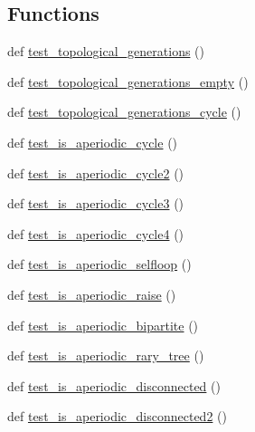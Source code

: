 \subsection*{Functions}
\begin{DoxyCompactItemize}
\item 
def \hyperlink{namespacenetworkx_1_1algorithms_1_1tests_1_1test__dag_a7080d417e9d6ce02a70401e19892cd88}{test\+\_\+topological\+\_\+generations} ()
\item 
def \hyperlink{namespacenetworkx_1_1algorithms_1_1tests_1_1test__dag_a781d94dab85882ace50f79833d412bad}{test\+\_\+topological\+\_\+generations\+\_\+empty} ()
\item 
def \hyperlink{namespacenetworkx_1_1algorithms_1_1tests_1_1test__dag_ad8457c64fd4274f7d4ce3594dbc98c3e}{test\+\_\+topological\+\_\+generations\+\_\+cycle} ()
\item 
def \hyperlink{namespacenetworkx_1_1algorithms_1_1tests_1_1test__dag_a518a2e0f6db21c276b9105a496f12f94}{test\+\_\+is\+\_\+aperiodic\+\_\+cycle} ()
\item 
def \hyperlink{namespacenetworkx_1_1algorithms_1_1tests_1_1test__dag_a3743d8eaea870cc82b142f9b525ec639}{test\+\_\+is\+\_\+aperiodic\+\_\+cycle2} ()
\item 
def \hyperlink{namespacenetworkx_1_1algorithms_1_1tests_1_1test__dag_a2d87f47b709488e7031300c8e3f9e455}{test\+\_\+is\+\_\+aperiodic\+\_\+cycle3} ()
\item 
def \hyperlink{namespacenetworkx_1_1algorithms_1_1tests_1_1test__dag_aa475d6f3cefe2f72beb161d60101915b}{test\+\_\+is\+\_\+aperiodic\+\_\+cycle4} ()
\item 
def \hyperlink{namespacenetworkx_1_1algorithms_1_1tests_1_1test__dag_aacf751a12cd0f84d99e8c2e64b95de45}{test\+\_\+is\+\_\+aperiodic\+\_\+selfloop} ()
\item 
def \hyperlink{namespacenetworkx_1_1algorithms_1_1tests_1_1test__dag_a897c1bbc39a730de6e3d789c996e543c}{test\+\_\+is\+\_\+aperiodic\+\_\+raise} ()
\item 
def \hyperlink{namespacenetworkx_1_1algorithms_1_1tests_1_1test__dag_af5e0bc8ad09288520943384726cda9b3}{test\+\_\+is\+\_\+aperiodic\+\_\+bipartite} ()
\item 
def \hyperlink{namespacenetworkx_1_1algorithms_1_1tests_1_1test__dag_ac5ec71de381595094a8167100170c277}{test\+\_\+is\+\_\+aperiodic\+\_\+rary\+\_\+tree} ()
\item 
def \hyperlink{namespacenetworkx_1_1algorithms_1_1tests_1_1test__dag_a4b2901fa7f1ceb6cfc71850b1c4b7235}{test\+\_\+is\+\_\+aperiodic\+\_\+disconnected} ()
\item 
def \hyperlink{namespacenetworkx_1_1algorithms_1_1tests_1_1test__dag_ad2aeec50266fd79a307510f8a3ebe078}{test\+\_\+is\+\_\+aperiodic\+\_\+disconnected2} ()
\end{DoxyCompactItemize}


